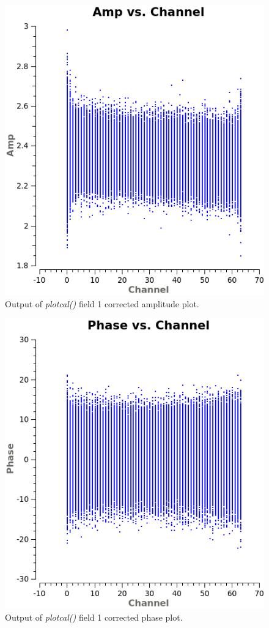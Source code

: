 \documentclass[12pt, a4paper]{article}
\begin{document}
\begin{figure}[h!]
    \centering
    \includegraphics[scale=0.5]{../Imaging/plots2/part4-subH-question3_fld1-corrected-amp.png}
    \caption{Output of \emph{plotcal()} field 1 corrected amplitude plot. \label{fig:part4subH-amp-1}}
\end{figure}
\begin{figure}[h!]
    \centering
    \includegraphics[scale=0.5]{../Imaging/plots2/part4-subH-question3_fld1-corrected-phase.png}
    \caption{Output of \emph{plotcal()} field 1 corrected phase plot. \label{fig:part4subH-phase-1}}
\end{figure}
\newpage
\end{document}
